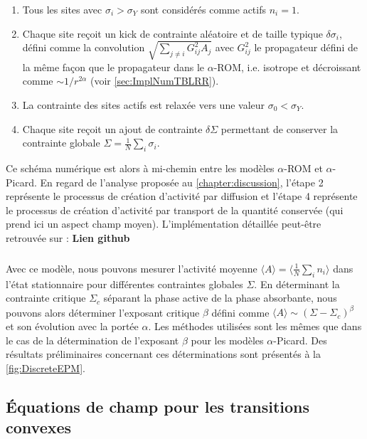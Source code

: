 \begin{enumerate}
	\item Tous les sites avec $\sigma_i > \sigma_Y$ sont considérés comme actifs $n_i=1$.
	\item Chaque site reçoit un kick de contrainte aléatoire et de taille typique $\delta\sigma_i$, défini comme la convolution $\sqrt{\sum_{j\neq i}G_{ij}^2A_j}$ avec $G_{ij}^2$ le propagateur défini de la même façon que le propagateur dans le $\alpha$-ROM, i.e. isotrope et décroissant comme $\sim 1/r^{2\alpha}$ (voir \autoref{sec:ImplNumTBLRR}).
	\item La contrainte des sites actifs est relaxée vers une valeur $\sigma_0 < \sigma_Y$.
	\item Chaque site reçoit un ajout de contrainte $\delta\Sigma$ permettant de conserver la contrainte globale $\Sigma = \frac{1}{N}\sum_{i}\sigma_i$.
\end{enumerate}

\noindent Ce schéma numérique est alors à mi-chemin entre les modèles $\alpha$-ROM et $\alpha$-Picard. En regard de l'analyse proposée au \autoref{chapter:discussion}, l'étape 2 représente le processus de création d'activité par diffusion et l'étape 4 représente le processus de création d'activité par transport de la quantité conservée (qui prend ici un aspect champ moyen). L'implémentation détaillée peut-être retrouvée sur : \textbf{Lien github}

\subparagraph{}Avec ce modèle, nous pouvons mesurer l'activité moyenne $\langle A \rangle = \langle \frac{1}{N}\sum_{i}n_i \rangle $ dans l'état stationnaire pour différentes contraintes globales $\Sigma$. En déterminant la contrainte critique $\Sigma_c$ séparant la phase active de la phase absorbante, nous pouvons alors déterminer l'exposant critique $\beta$ défini comme $\langle A \rangle \sim (\Sigma - \Sigma_c)^\beta$ et son évolution avec la portée $\alpha$. Les méthodes utilisées sont les mêmes que dans le cas de la détermination de l'exposant $\beta$ pour les modèles $\alpha$-Picard. Des résultats préliminaires concernant ces déterminations sont présentés à la \autoref{fig:DiscreteEPM}.

\FloatBarrier

\subsection{Équations de champ pour les transitions convexes}

\label{sec:eqchampconvexe}

